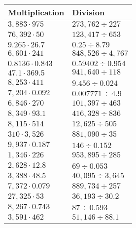 \begin{longtable}[]{@{}ll@{}}
\toprule
Multiplication & Division\tabularnewline
\midrule
\endhead
\(3,883\cdot975\) & \(273,762÷227\)\tabularnewline
\(76,392\cdot50\) & \(123,417÷653\)\tabularnewline
\(9.265\cdot26.7\) & \(0.25 ÷8.79\)\tabularnewline
\(6,601\cdot241\) & \(848,526÷4,767\)\tabularnewline
\(0.8136\cdot0.843\) & \(0.59402÷0.954\)\tabularnewline
\(47.1\cdot369.5\) & \(941,640÷118\)\tabularnewline
\(8,253\cdot411\) & \(9.456÷0.024\)\tabularnewline
\(7,204\cdot0.092\) & \(0.007771÷4.9\)\tabularnewline
\(6,846\cdot270\) & \(101,397÷463\)\tabularnewline
\(8,349\cdot93.1\) & \(416,328÷836\)\tabularnewline
\(8,115\cdot514\) & \(12,625÷505\)\tabularnewline
\(310\cdot3,526\) & \(881,090÷35\)\tabularnewline
\(9,937\cdot0.187\) & \(146÷0.152\)\tabularnewline
\(1,346\cdot226\) & \(953,895÷285\)\tabularnewline
\(2,628\cdot12.8\) & \(69÷0.053\)\tabularnewline
\(3,388\cdot48.5\) & \(40,095÷3,645\)\tabularnewline
\(7,372\cdot0.079\) & \(889,734÷257\)\tabularnewline
\(27,325\cdot53\) & \(36,193÷30.2\)\tabularnewline
\(8,267\cdot0.743\) & \(87÷0.593\)\tabularnewline
\(3,591\cdot462\) & \(51,146÷88.1\)\tabularnewline
\bottomrule
\end{longtable}
